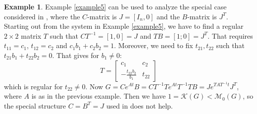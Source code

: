\documentclass[12pt, a4paper,reqno]{amsart}
\theoremstyle{definition}
\newtheorem{example}{Example}{\rm}
\begin{document}


\begin{example} %
\label{example7}
    Example \ref{example5} can be used to analyze the special case considered in \cite{an_kreiss}, where the $C$-matrix
    is $J=[I_n,0]$ and the $B$-matrix is $J^T$.
    Starting out from the system
    in Example \ref{example5},
    we have to find a regular $2\times 2$
 matrix $T$ such that $CT^{-1}=[1,0]=J$ and $TB = [1;0]=J^T$. That requires $t_{11}=c_1$, $t_{12}=c_2$ and
 $c_1b_1+c_2b_2=1$. Moreover, we need to fix $t_{21},t_{22}$ such that
 $t_{21}b_1+t_{22}b_2=0$. That gives for $b_1 \not=0$:
 $$
 T = \begin{bmatrix} c_1 & c_2\\ -\frac{t_{22}b_2}{b_1}&t_{22}\end{bmatrix}
 $$
 which is regular for $t_{22}\not=0$. Now $G=Ce^{At}B= CT^{-1}T e^{At}T^{-1}TB=
 J  e^{TAT^{-1}t} J^T$, where $A$ is as in the previous example.  Then we have $1=\mathcal K(G)< \mathcal M_0(G)$,
 so the special structure $C=B^T=J$ used in \cite{an_kreiss} does not help. 
\end{example}




\end{document}
